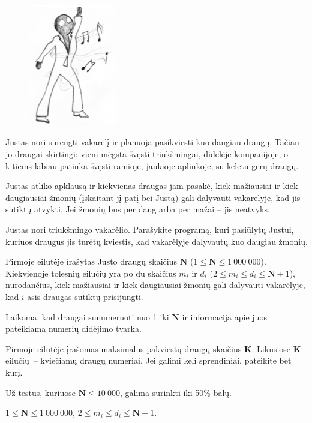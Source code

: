 \documentclass{liostyle}
\newcommand{\maxN}{1\ 000\ 000}
\begin{document}
\begin{figure}
\vspace{-20pt}
\includegraphics[width=3.8cm]{draugai_fig1}
\vspace{-20pt}
\end{figure}

Justas nori surengti vakarėlį ir planuoja pasikviesti kuo 
daugiau draugų. Tačiau jo draugai skirtingi: vieni mėgsta 
švęsti triukšmingai, didelėje kompanijoje, o kitiems labiau 
patinka švęsti ramioje, jaukioje aplinkoje, su keletu gerų 
draugų.


Justas atliko apklausą ir kiekvienas draugas jam pasakė, kiek 
mažiausiai ir kiek daugiausiai žmonių (įskaitant jį patį bei 
Justą) gali dalyvauti vakarėlyje, kad jis sutiktų atvykti. Jei
žmonių bus per daug arba per mažai – jis neatvyks.

\Task
Justas nori triukšmingo vakarėlio. Parašykite programą, kuri pasiūlytų 
Justui, kuriuos draugus jis turėtų kviestis, kad vakarėlyje dalyvautų kuo daugiau 
žmonių.

\Input
Pirmoje eilutėje įrašytas Justo draugų skaičius $\mathbf{N}$
($1 \le \mathbf{N} \le \maxN$). Kiekvienoje tolesnių eilučių yra po du skaičius
$m_i$ ir $d_i$ ($2\le m_i\le d_i\le \mathbf{N}+1$), nurodančius, kiek
mažiausiai ir kiek daugiausiai žmonių gali dalyvauti vakarėlyje, kad $i$-asis
draugas sutiktų prisijungti.

Laikoma, kad draugai sunumeruoti nuo 1 iki $\mathbf{N}$ ir informacija apie
juos pateikiama numerių didėjimo tvarka.

\Output
Pirmoje eilutėje įrašomas maksimalus pakviestų draugų skaičius $\mathbf{K}$.
Likusiose $\mathbf{K}$ eilučių~-- kviečiamų draugų numeriai. Jei galimi keli sprendiniai,
pateikite bet kurį.

\Examples
{}

\Grading
Už testus, kuriuose $\mathbf{N} \le 10\ 000$, galima surinkti iki 50\% balų.

\Constraints
$1 \le \mathbf{N} \le \maxN$,\enskip
$2\le m_i\le d_i\le \mathbf{N}+1$.
\end{document}
